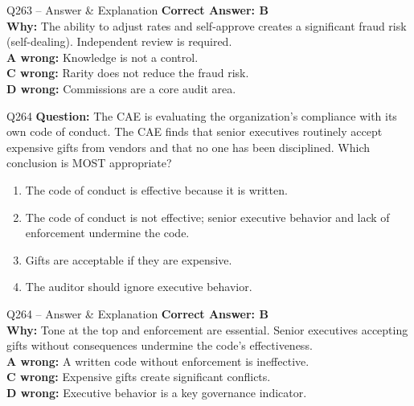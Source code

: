 \documentclass[aspectratio=169,10pt]{beamer}
\begin{document}
	\begin{frame}[t]{Q263 -- Answer \& Explanation}
		\small
		\textbf{Correct Answer: B} \\[4pt]
		\textbf{Why:} The ability to adjust rates and self-approve creates a significant fraud risk (self-dealing). Independent review is required. \\[4pt]
		\textbf{A wrong:} Knowledge is not a control. \\[2pt]
		\textbf{C wrong:} Rarity does not reduce the fraud risk. \\[2pt]
		\textbf{D wrong:} Commissions are a core audit area.
	\end{frame}
	
	\begin{frame}[t]{Q264}
		\small
		\textbf{Question:} The CAE is evaluating the organization's compliance with its own code of conduct. The CAE finds that senior executives routinely accept expensive gifts from vendors and that no one has been disciplined. Which conclusion is MOST appropriate?
		\begin{enumerate}[label=\Alph*.,itemsep=1pt,topsep=2pt]
			\item The code of conduct is effective because it is written.
			\item The code of conduct is not effective; senior executive behavior and lack of enforcement undermine the code.
			\item Gifts are acceptable if they are expensive.
			\item The auditor should ignore executive behavior.
		\end{enumerate}
	\end{frame}
	
	\begin{frame}[t]{Q264 -- Answer \& Explanation}
		\small
		\textbf{Correct Answer: B} \\[4pt]
		\textbf{Why:} Tone at the top and enforcement are essential. Senior executives accepting gifts without consequences undermine the code's effectiveness. \\[4pt]
		\textbf{A wrong:} A written code without enforcement is ineffective. \\[2pt]
		\textbf{C wrong:} Expensive gifts create significant conflicts. \\[2pt]
		\textbf{D wrong:} Executive behavior is a key governance indicator.
	\end{frame}
	
\end{document}
